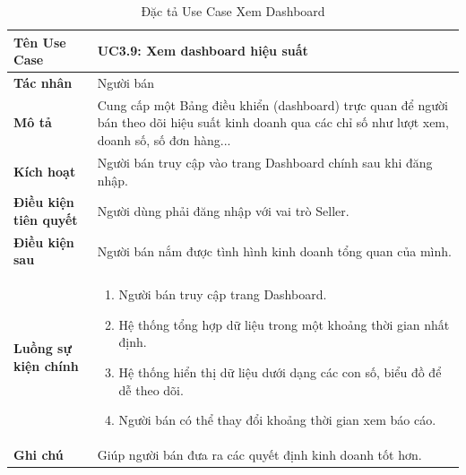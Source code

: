 \begin{table}[H]
\centering
\begin{tabularx}{\textwidth}{|l|X|}
\hline
\textbf{Tên Use Case} & \textbf{UC3.9: Xem dashboard hiệu suất} \\ \hline
\textbf{Tác nhân} & Người bán \\ \hline
\textbf{Mô tả} & Cung cấp một Bảng điều khiển (dashboard) trực quan để người bán theo dõi hiệu suất kinh doanh qua các chỉ số như lượt xem, doanh số, số đơn hàng... \\ \hline
\textbf{Kích hoạt} & Người bán truy cập vào trang Dashboard chính sau khi đăng nhập. \\ \hline
\textbf{Điều kiện tiên quyết} & Người dùng phải đăng nhập với vai trò Seller. \\ \hline
\textbf{Điều kiện sau} & Người bán nắm được tình hình kinh doanh tổng quan của mình. \\ \hline
\textbf{Luồng sự kiện chính} & 
\begin{enumerate}
    \item Người bán truy cập trang Dashboard.
    \item Hệ thống tổng hợp dữ liệu trong một khoảng thời gian nhất định.
    \item Hệ thống hiển thị dữ liệu dưới dạng các con số, biểu đồ để dễ theo dõi.
    \item Người bán có thể thay đổi khoảng thời gian xem báo cáo.
\end{enumerate} \\ \hline
\textbf{Ghi chú} & Giúp người bán đưa ra các quyết định kinh doanh tốt hơn. \\ \hline
\end{tabularx}
\caption{Đặc tả Use Case Xem Dashboard}
\end{table}

